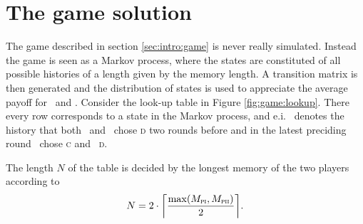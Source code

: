 \section{The game solution}\label{sec:game}
The game described in section \ref{sec:intro:game} is never really simulated. Instead the game is seen as a Markov process, where the states are constituted of all possible histories of a length given by the memory length. A transition matrix is then generated and the distribution of states is used to appreciate the average payoff for \pone\ and \ptwo. Consider the look-up table in Figure \ref{fig:game:lookup}. There every row corresponds to a state in the Markov process, and e.i.\  denotes the history that both \pone\ and \ptwo\ chose \textsc{d} two rounds before and in the latest preciding round \pone\ chose \textsc{c} and \ptwo\ \textsc{d}.\mypar

The length $N$ of the table  is decided by the longest memory of the two players according to
\begin{equation*}
N = 2\cdot{\left\lceil{\frac{\max(M_{\textsc{pi}}, M_{\textsc{pii}})}{2}}\right\rceil}.
\end{equation*}

